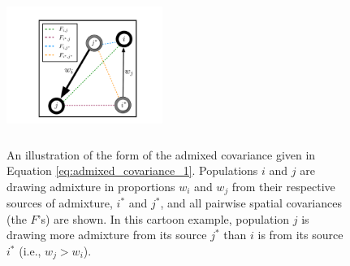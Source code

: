 \documentclass[10pt,letterpaper]{article}
\newcommand{\identifyadmixsource}[1]{{#1^{*}}}
\begin{document}
\begin{figure}[htp!]
	\centering
	\includegraphics[width=2in,height=2in]{../figs/admix_cov_fig.pdf}
	\caption{An illustration of the form of the admixed covariance given in Equation \eqref{eq:admixed_covariance_1}.  Populations $i$ and $j$ are drawing admixture in proportions $w_i$ and $w_j$ from their respective sources of admixture, $\identifyadmixsource{i}$ and $\identifyadmixsource{j}$, and all pairwise spatial covariances (the $F$'s) are shown.  In this cartoon example, population $j$ is drawing more admixture from its source $\identifyadmixsource{j}$ than $i$ is from its source $\identifyadmixsource{i}$ (i.e., $w_j > w_i$).
    }
\label{sfig:admixed_cov_diagram}
\end{figure}
\end{document}
